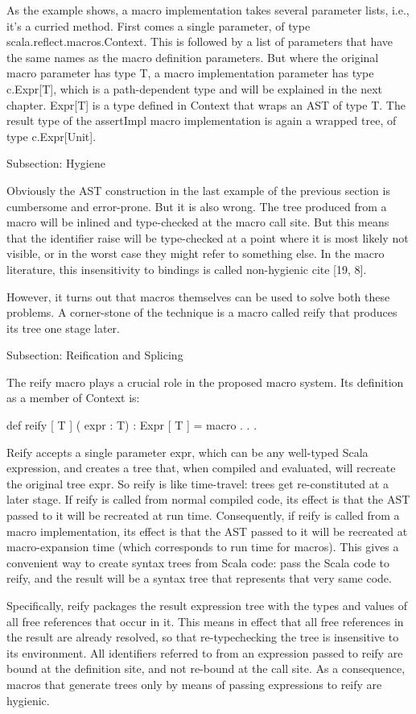 As the example shows, a macro implementation takes several parameter lists,
i.e., it's a curried method. First comes a single parameter, of type
scala.reflect.macros.Context. This is followed by a list of parameters that have
the same names as the macro definition parameters. But where the original macro
parameter has type T, a macro implementation parameter has type c.Expr[T], which
is a path-dependent type and will be explained in the next chapter. Expr[T] is a
type defined in Context that wraps an AST of type T. The result type of the
assertImpl macro implementation is again a wrapped tree, of type c.Expr[Unit].


Subsection: Hygiene

Obviously the AST construction in the last example of the
previous section is cumbersome and error-prone. But it is also wrong. The tree
produced from a macro will be inlined and type-checked at the macro call site.
But this means that the identifier raise will be type-checked at a point where
it is most likely not visible, or in the worst case they might refer to
something else. In the macro literature, this insensitivity to bindings is
called non-hygienic {cite [19, 8]}.

However, it turns out that macros themselves can be used to solve both these
problems. A corner-stone of the technique is a macro called reify that produces
its tree one stage later.


Subsection: Reification and Splicing

The reify macro plays a crucial role in the proposed macro system. Its
definition as a member of Context is:

def reify [ T ] ( expr : T) : Expr [ T ] = macro . . .

Reify accepts a single parameter expr, which can be any well-typed Scala
expression, and creates a tree that, when compiled and evaluated, will recreate
the original tree expr. So reify is like time-travel: trees get re-constituted
at a later stage. If reify is called from normal compiled code, its effect is
that the AST passed to it will be recreated at run time.
Consequently, if reify is called from a macro implementation, its effect is that
the AST passed to it will be recreated at macro-expansion time
(which corresponds to run time for macros). This gives a convenient way to
create syntax trees from Scala code: pass the Scala code to reify, and the
result will be a syntax tree that represents that very same code.

Specifically, reify packages the result expression tree with the types and
values of all free references that occur in it. This means in effect that all
free references in the result are already resolved, so that re-typechecking the
tree is insensitive to its environment. All identifiers referred to from
an expression passed to reify are bound at the definition site, and not re-bound
at the call site. As a consequence, macros that generate trees only by means
of passing expressions to reify are hygienic.

